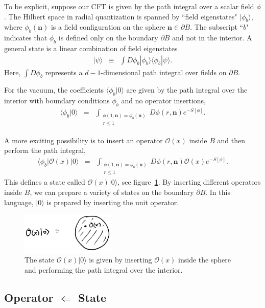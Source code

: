 \documentclass{ws-rv9x6}
\newcommand\be{\begin{eqnarray}}
\newcommand\ee{\end{eqnarray}}
\newcommand\cO{\mathcal{O}}
\newcommand\ptl\partial
\newcommand\<\langle
\renewcommand\>\rangle
\renewcommand\.{\cdot}
\newcommand\bn{\mathbf{n}}
\begin{document}
To be explicit, suppose our CFT is given by the path integral over a scalar field $\phi$.  The Hilbert space in radial quantization is spanned by ``field eigenstates" $|\phi_b\>$, where $\phi_b(\bn)$ is a field configuration on the sphere $\bn\in \ptl B$.  The subscript ``$b$" indicates that $\phi_b$ is defined only on the boundary $\ptl B$ and not in the interior.  A general state is a linear combination of field eigenstates
\be
|\psi\> &\equiv& \int D\phi_b |\phi_b\>\<\phi_b|\psi\>.
\ee
Here, $\int D\phi_b$ represents a $d-1$-dimensional path integral over fields on $\ptl B$.

For the vacuum, the coefficients $\<\phi_b|0\>$ are given by the path integral over the interior with boundary conditions $\phi_b$ and no operator insertions,
\be
\<\phi_b |0\> &=&  \int_{\substack{\phi(1,\bn)=\phi_b(\bn) \\ r \leq 1}} D\phi(r,\bn) e^{-S[\phi]}.
\ee

A more exciting possibility is to insert an operator $\cO(x)$ inside $B$ and then perform the path integral,
\be
\<\phi_b|\cO(x)|0\> &=& \int_{\substack{\phi(1,\bn)=\phi_b(\bn) \\ r \leq 1}} D\phi(r,\bn) \cO(x) e^{-S[\phi]}.
\ee
This defines a state called $\cO(x)|0\>$, see figure~\ref{fig:radialexcited}.
By inserting different operators inside $B$, we can prepare a variety of states on the boundary $\ptl B$. In this language, $|0\>$ is prepared by inserting the unit operator.

\begin{figure}
\begin{center}
\includegraphics[width=0.4\textwidth]{radialexcited.jpg}
\end{center}
\caption{The state $\cO(x)|0\>$ is given by inserting $\cO(x)$ inside the sphere and performing the path integral over the interior.  \label{fig:radialexcited}}
\end{figure}

\subsection{Operator $\Longleftarrow$ State}
\end{document}
